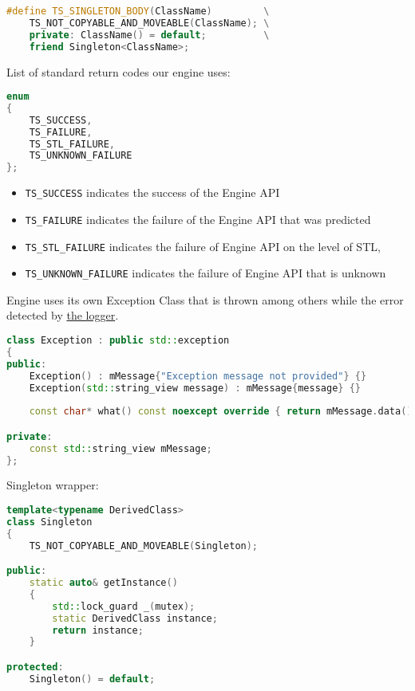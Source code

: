 \begin{itemize}
\begin{itemize}
\begin{lstlisting}[language=c++, caption=Preprocessor definitions of public Engine Utils(./engine/include/tsengine/utils.hpp)]
#define TS_SINGLETON_BODY(ClassName)         \
    TS_NOT_COPYABLE_AND_MOVEABLE(ClassName); \
    private: ClassName() = default;          \
    friend Singleton<ClassName>;
\end{lstlisting}
\label{sec:return_codes}
List of standard return codes our engine uses:
\begin{lstlisting}[language=c++, caption=Return codes of public Engine Utils(./engine/include/tsengine/utils.hpp)]
enum
{
    TS_SUCCESS,
    TS_FAILURE,
    TS_STL_FAILURE,
    TS_UNKNOWN_FAILURE
};
\end{lstlisting}
\begin{itemize}
    \item \texttt{TS\_SUCCESS} indicates the success of the Engine API
    \item \texttt{TS\_FAILURE} indicates the failure of the Engine API that was predicted
    \item \texttt{TS\_STL\_FAILURE} indicates the failure of Engine API on the level of STL,
    \item \texttt{TS\_UNKNOWN\_FAILURE} indicates the failure of Engine API that is unknown
\end{itemize}
Engine uses its own Exception Class that is thrown among others while the error detected by \hyperref[sec:logger]{the logger}.
\begin{lstlisting}[language=c++, caption=Exception of public Engine Utils(./engine/include/tsengine/utils.hpp)]
class Exception : public std::exception
{
public:
    Exception() : mMessage{"Exception message not provided"} {}
    Exception(std::string_view message) : mMessage{message} {}
    
    const char* what() const noexcept override { return mMessage.data(); }

private:
    const std::string_view mMessage;
};
\end{lstlisting}
Singleton wrapper:
\begin{lstlisting}[language=c++, caption=Singleton of Public Engine Utils(./engine/include/tsengine/utils.hpp)]
template<typename DerivedClass>
class Singleton
{
    TS_NOT_COPYABLE_AND_MOVEABLE(Singleton);

public:
    static auto& getInstance()
    {
        std::lock_guard _(mutex);
        static DerivedClass instance;
        return instance;
    }

protected:
    Singleton() = default;


\end{lstlisting}
\end{itemize}
\end{itemize}
